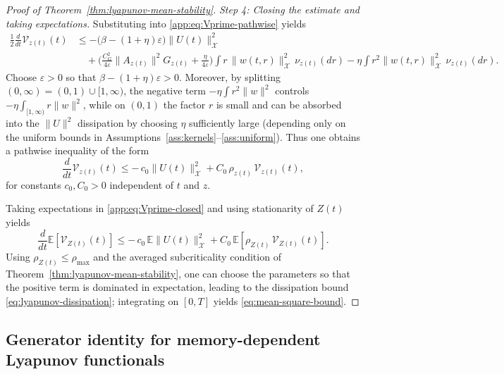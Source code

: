 \documentclass[12pt,a4paper]{article}
\theoremstyle{plain}
\theoremstyle{definition}
\theoremstyle{remark}
\begin{document}
\begin{proof}[Proof of Theorem~\ref{thm:lyapunov-mean-stability}]
		\smallskip\noindent
		\emph{Step 4: Closing the estimate and taking expectations.}
		Substituting into \eqref{app:eq:Vprime-pathwise} yields
		\begin{align}
			\label{app:eq:Vprime-pre}
			\frac12\frac{d}{dt}\mathcal V_{z(t)}(t)
			&\le
			-\big(\beta-(1+\eta)\varepsilon\big)\|U(t)\|_{\mathcal X}^2\nonumber\\
			&\quad
			+\Big(
			\frac{C_G^2}{4\varepsilon}\|A_{z(t)}\|^2G_{z(t)}
			+\frac{\eta}{4\varepsilon}
			\Big)\int r\,\|w(t,r)\|_{\mathcal X}^2\,\nu_{z(t)}(dr)
			-\eta\int r^2\|w(t,r)\|_{\mathcal X}^2\,\nu_{z(t)}(dr).
		\end{align}
		Choose $\varepsilon>0$ so that $\beta-(1+\eta)\varepsilon>0$.
		Moreover, by splitting $(0,\infty)=(0,1)\cup[1,\infty)$, the negative term
		$-\eta\int r^2\|w\|^2$ controls $-\eta\int_{[1,\infty)} r\|w\|^2$, while on $(0,1)$
		the factor $r$ is small and can be absorbed into the $\|U\|^2$ dissipation by
		choosing $\eta$ sufficiently large (depending only on the uniform bounds in
		Assumptions~\ref{ass:kernels}--\ref{ass:uniform}).
		Thus one obtains a pathwise inequality of the form
		\begin{equation}
			\label{app:eq:Vprime-closed}
			\frac{d}{dt}\mathcal V_{z(t)}(t)
			\le
			-\,c_0\|U(t)\|_{\mathcal X}^2
			+
			C_0\,\rho_{z(t)}\,\mathcal V_{z(t)}(t),
		\end{equation}
		for constants $c_0,C_0>0$ independent of $t$ and $z$.
		
		Taking expectations in \eqref{app:eq:Vprime-closed} and using stationarity of
		$Z(t)$ yields
		\[
		\frac{d}{dt}\mathbb E[\mathcal V_{Z(t)}(t)]
		\le
		-\,c_0\,\mathbb E\|U(t)\|_{\mathcal X}^2
		+
		C_0\,\mathbb E[\rho_{Z(t)}\,\mathcal V_{Z(t)}(t)].
		\]
		Using $\rho_{Z(t)}\le \rho_{\max}$ and the averaged subcriticality condition of
		Theorem~\ref{thm:lyapunov-mean-stability}, one can choose the parameters so that
		the positive term is dominated in expectation, leading to the dissipation bound
		\eqref{eq:lyapunov-dissipation}; integrating on $[0,T]$ yields
		\eqref{eq:mean-square-bound}.
	\end{proof}
	
	\subsection{Generator identity for memory-dependent Lyapunov functionals}
	\label{app:generator}
	
\end{document}
